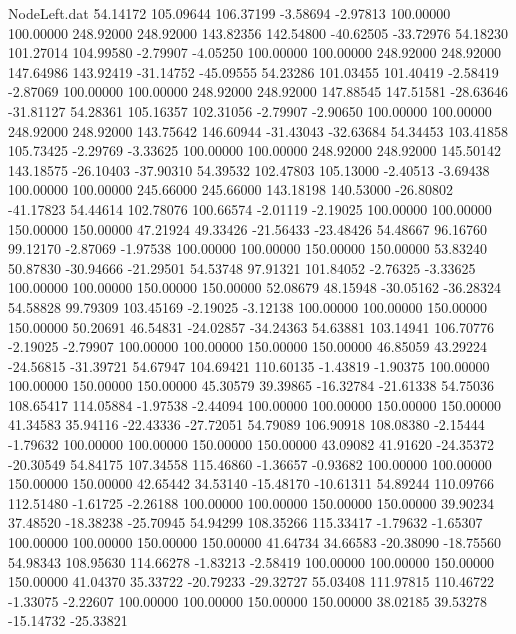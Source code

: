 \begin{filecontents}{NodeLeft.dat}
  54.14172  105.09644  106.37199    -3.58694   -2.97813  100.00000  100.00000  248.92000  248.92000  143.82356  142.54800  -40.62505  -33.72976
  54.18230  101.27014  104.99580    -2.79907   -4.05250  100.00000  100.00000  248.92000  248.92000  147.64986  143.92419  -31.14752  -45.09555
  54.23286  101.03455  101.40419    -2.58419   -2.87069  100.00000  100.00000  248.92000  248.92000  147.88545  147.51581  -28.63646  -31.81127
  54.28361  105.16357  102.31056    -2.79907   -2.90650  100.00000  100.00000  248.92000  248.92000  143.75642  146.60944  -31.43043  -32.63684
  54.34453  103.41858  105.73425    -2.29769   -3.33625  100.00000  100.00000  248.92000  248.92000  145.50142  143.18575  -26.10403  -37.90310
  54.39532  102.47803  105.13000    -2.40513   -3.69438  100.00000  100.00000  245.66000  245.66000  143.18198  140.53000  -26.80802  -41.17823
  54.44614  102.78076  100.66574    -2.01119   -2.19025  100.00000  100.00000  150.00000  150.00000   47.21924   49.33426  -21.56433  -23.48426
  54.48667   96.16760   99.12170    -2.87069   -1.97538  100.00000  100.00000  150.00000  150.00000   53.83240   50.87830  -30.94666  -21.29501
  54.53748   97.91321  101.84052    -2.76325   -3.33625  100.00000  100.00000  150.00000  150.00000   52.08679   48.15948  -30.05162  -36.28324
  54.58828   99.79309  103.45169    -2.19025   -3.12138  100.00000  100.00000  150.00000  150.00000   50.20691   46.54831  -24.02857  -34.24363
  54.63881  103.14941  106.70776    -2.19025   -2.79907  100.00000  100.00000  150.00000  150.00000   46.85059   43.29224  -24.56815  -31.39721
  54.67947  104.69421  110.60135    -1.43819   -1.90375  100.00000  100.00000  150.00000  150.00000   45.30579   39.39865  -16.32784  -21.61338
  54.75036  108.65417  114.05884    -1.97538   -2.44094  100.00000  100.00000  150.00000  150.00000   41.34583   35.94116  -22.43336  -27.72051
  54.79089  106.90918  108.08380    -2.15444   -1.79632  100.00000  100.00000  150.00000  150.00000   43.09082   41.91620  -24.35372  -20.30549
  54.84175  107.34558  115.46860    -1.36657   -0.93682  100.00000  100.00000  150.00000  150.00000   42.65442   34.53140  -15.48170  -10.61311
  54.89244  110.09766  112.51480    -1.61725   -2.26188  100.00000  100.00000  150.00000  150.00000   39.90234   37.48520  -18.38238  -25.70945
  54.94299  108.35266  115.33417    -1.79632   -1.65307  100.00000  100.00000  150.00000  150.00000   41.64734   34.66583  -20.38090  -18.75560
  54.98343  108.95630  114.66278    -1.83213   -2.58419  100.00000  100.00000  150.00000  150.00000   41.04370   35.33722  -20.79233  -29.32727
  55.03408  111.97815  110.46722    -1.33075   -2.22607  100.00000  100.00000  150.00000  150.00000   38.02185   39.53278  -15.14732  -25.33821

\end{filecontents}
